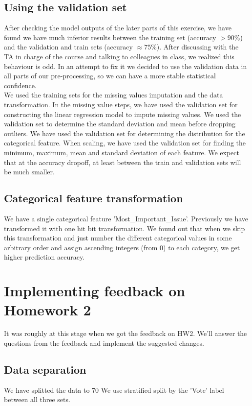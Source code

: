 \documentclass[12pt]{article}
\begin{document}
\subsection{Using the validation set}
After checking the model outputs of the later parts of this exercise, we have found we have much inferior results between the training set (accuracy $>90\%$) and the validation and train sets (accuracy $\approx 75\%$). 
After discussing with the TA in charge of the course and talking to colleagues in class, we realized this behaviour is odd. In an attempt to fix it we decided to use the validation data in all parts of our pre-processing, so we can have a more stable statistical confidence.\\
We used the training sets for the missing values imputation and the data transformation. In the missing value steps, we have used the validation set for constructing the linear regression model to impute missing values. We used the validation set to determine the standard deviation and mean before dropping outliers. We have used the validation set for determining the distribution for the categorical feature. When scaling, we have used the validation set for finding the minimum, maximum, mean and standard deviation of each feature. We expect that at the accuracy dropoff, at least between the train and validation sets will be much smaller.

\subsection{Categorical feature transformation}
We have a single categorical feature 'Most\_Important\_Issue'. Previously we have transformed it with one hit bit transformation. We found out that when we skip this transformation and just number the different categorical values in some arbitrary order and assign ascending integers (from 0) to each category, we get higher prediction accuracy.

\section{Implementing feedback on Homework 2}
It was roughly at this stage when we got the feedback on HW2. We'll answer the questions from the feedback and implement the suggested changes.
\subsection{Data separation}
We have splitted the data to 70%
We use stratified split by the 'Vote' label between all three sets.
\end{document}

